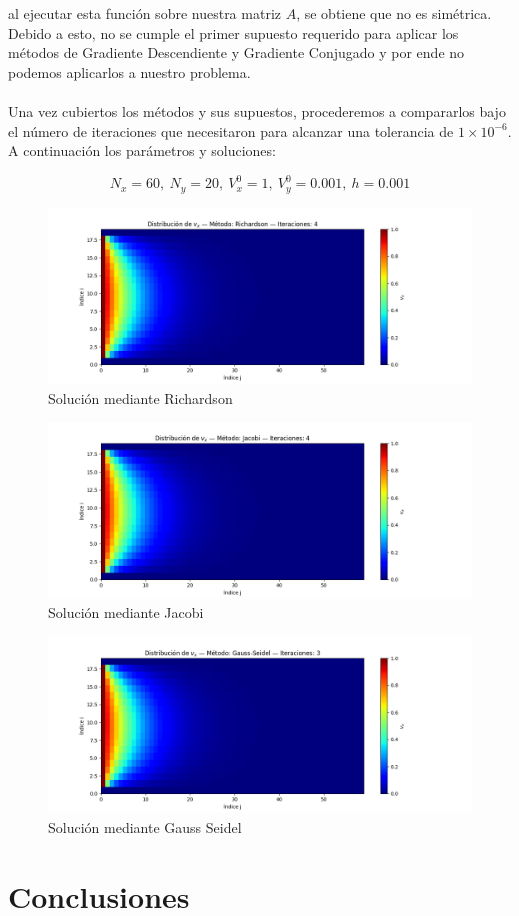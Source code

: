 \documentclass{article}
\begin{document}
  al ejecutar esta función sobre nuestra matriz $A$, se obtiene que no es simétrica. Debido a esto, no se cumple el primer supuesto requerido para aplicar los métodos de Gradiente Descendiente y Gradiente Conjugado y por ende no podemos aplicarlos a nuestro problema.

  \paragraph{}
  Una vez cubiertos los métodos y sus supuestos, procederemos a compararlos bajo el número de iteraciones que necesitaron para alcanzar una tolerancia de $1\times10^{-6}$. A continuación los parámetros y soluciones:

  \[N_x=60, \ N_y=20, \ V_x^0=1, \ V_y^0=0.001, \ h=0.001\]

  \begin{figure}[H]
      \centering
      \includegraphics[width=1.2\textwidth]{Richardson.png}
      \caption{Solución mediante Richardson}
  \end{figure}

  \begin{figure}[H]
      \centering
      \includegraphics[width=1.2\textwidth]{Jacobi.png}
      \caption{Solución mediante Jacobi}
  \end{figure}

  \begin{figure}[H]
      \centering
      \includegraphics[width=1.2\textwidth]{GaussSeidel.png}
      \caption{Solución mediante Gauss Seidel}
  \end{figure}

  \section*{Conclusiones}

  \renewcommand{\refname}{Referencias}
  
  
\end{document}
